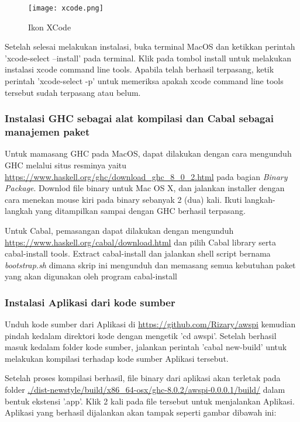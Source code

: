 \documentclass[pi.tex]{subfile}
\begin{document}
  \begin{figure}[H]
      \centering
  \texttt{[image: xcode.png]}
  \caption[Ikon XCode]{Ikon XCode}
  \end{figure}

  Setelah selesai melakukan instalasi, buka terminal MacOS dan ketikkan perintah 'xcode-select --install' pada terminal. Klik pada tombol install untuk melakukan instalasi xcode command line tools. Apabila telah berhasil terpasang, ketik perintah 'xcode-select -p' untuk memeriksa apakah xcode command line tools tersebut sudah terpasang atau belum.
  
\subsubsection{Instalasi GHC sebagai alat kompilasi dan Cabal sebagai manajemen paket}
  Untuk mamasang GHC pada MacOS, dapat dilakukan dengan cara mengunduh GHC melalui situs resminya yaitu \url{https://www.haskell.org/ghc/download_ghc_8_0_2.html} pada bagian \emph{Binary Package}. Downlod file binary untuk Mac OS X, dan jalankan installer dengan cara menekan mouse kiri pada binary sebanyak 2 (dua) kali. Ikuti langkah-langkah yang ditampilkan sampai dengan GHC berhasil terpasang.

  Untuk Cabal, pemasangan dapat dilakukan dengan mengunduh \url{https://www.haskell.org/cabal/download.html} dan pilih Cabal library serta cabal-install tools. Extract cabal-install dan jalankan shell script bernama \emph{bootstrap.sh} dimana skrip ini mengunduh dan memasang semua kebutuhan paket yang akan digunakan oleh program cabal-install
  
\subsubsection{Instalasi Aplikasi dari kode sumber}
  Unduh kode sumber dari Aplikasi di \url{https://github.com/Rizary/awspi} kemudian pindah kedalam direktori kode dengan mengetik 'cd awspi'. Setelah berhasil masuk kedalam folder kode sumber, jalankan perintah 'cabal new-build' untuk melakukan kompilasi terhadap kode sumber Aplikasi tersebut.

  Setelah proses kompilasi berhasil, file binary dari aplikasi akan terletak pada folder \url{./dist-newstyle/build/x86_64-osx/ghc-8.0.2/awspi-0.0.0.1/build/} dalam bentuk ekstensi '.app'. Klik 2 kali pada file tersebut untuk menjalankan Aplikasi. Aplikasi yang berhasil dijalankan akan tampak seperti gambar dibawah ini:
  
\end{document}

